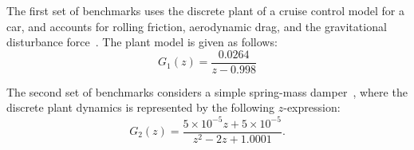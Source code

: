 \documentclass[final]{sig-alternate-05-2015}
\begin{document}
The first set of benchmarks uses the discrete plant of a cruise control
model for a car, and accounts for rolling friction, aerodynamic drag, and
the gravitational disturbance force~\cite{Astrom08}. The plant model is
given as follows:
%
\begin{equation}
\label{cruise-control-c1}
G_1(z)=\frac{0.0264}{z-0.998} \nonumber
\end{equation} 

%
%

The second set of benchmarks considers a simple spring-mass 
damper~\cite{DBLP:conf/hybrid/WangGRJF16}, where the discrete 
plant dynamics is represented by the following $z$-expression:
%
%
\begin{equation}
\label{spring-mass-damper-g}
G_2(z)=\frac{5\times{10^{-5}}z + 5\times{10^{-5}}}{z^2 - 2z + 1.0001}. \nonumber
\end{equation} 
%
\end{document}
